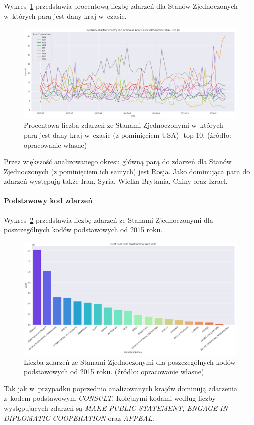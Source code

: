 \documentclass[11pt]{report}
\begin{document}
    Wykres~\ref{fig:USApairPerc} przedstawia procentową liczbę zdarzeń dla Stanów Zjednoczonych w~których parą jest dany kraj w~czasie.
    \begin{figure}[!htp]
        \centering
        \includegraphics[width=\linewidth]{fig/USA/USAactor2PairPercinTIME.png}
        \caption{Procentowa liczba zdarzeń ze Stanami Zjednoczonymi w~których parą jest dany kraj w~czasie (z pominięciem USA)- top 10. (źródło: opracowanie własne)}
        \label{fig:USApairPerc}
    \end{figure}
    Przez większość analizowanego okresu główną parą do zdarzeń dla Stanów Zjednoczonych (z pominięciem ich samych) jest Rosja.
    Jako dominująca para do zdarzeń występują także Iran, Syria, Wielka Brytania, Chiny oraz Izrael.

    \paragraph{Podstawowy kod zdarzeń}

    Wykres~\ref{fig:USAPERC} przedstawia liczbę zdarzeń ze Stanami Zjednoczonymi dla poszczególnych kodów podstawowych od 2015 roku.

    \begin{figure}[!htp]
        \centering
        \includegraphics[width=\linewidth]{fig/USA/USAERC.png}
        \caption{Liczba zdarzeń ze Stanami Zjednoczonymi dla poszczególnych kodów podstawowych od 2015 roku. (źródło: opracowanie własne)}
        \label{fig:USAPERC}
    \end{figure}
    Tak jak w~przypadku poprzednio analizowanych krajów dominują zdarzenia z~kodem podstawowym \textit{CONSULT}.
    Kolejnymi kodami według liczby występujących zdarzeń są \textit{MAKE PUBLIC STATEMENT, ENGAGE IN DIPLOMATIC COOPERATION} oraz \textit{APPEAL}.
\end{document}
